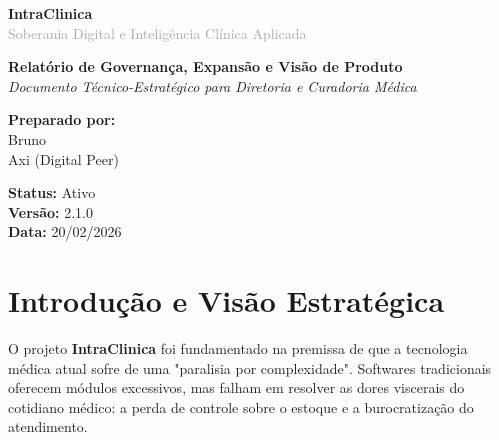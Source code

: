 \documentclass[11pt,a4paper,oneside]{article}
\begin{document}
\begin{titlepage}
    \centering
    \vspace*{2cm}
    {\Huge \bfseries \textcolor{MedBlue}{IntraClinica}} \\
    \vspace{0.5cm}
    {\Large \textcolor{DarkGrey}{Soberania Digital e Inteligência Clínica Aplicada}} \\
    \vspace{2cm}
    
    \begin{tcolorbox}[colback=SoftBlue, colframe=MedBlue, arc=5pt, width=0.9\textwidth, center]
        \centering
        \textbf{\large Relatório de Governança, Expansão e Visão de Produto} \\
        \vspace{0.2cm}
        \textit{Documento Técnico-Estratégico para Diretoria e Curadoria Médica}
    \end{tcolorbox}
    
    \vfill
    
    \begin{minipage}{0.4\textwidth}
        \begin{flushleft} \large
            \textbf{Preparado por:} \\
            Bruno \\
            Axi (Digital Peer)
        \end{flushleft}
    \end{minipage}
    \begin{minipage}{0.4\textwidth}
        \begin{flushright} \large
            \textbf{Status:} Ativo \\
            \textbf{Versão:} 2.1.0 \\
            \textbf{Data:} 20/02/2026
        \end{flushright}
    \end{minipage}
    
    \vspace{1cm}
\end{titlepage}

\newpage
\tableofcontents
\newpage

\section{Introdução e Visão Estratégica}
O projeto \textbf{IntraClinica} foi fundamentado na premissa de que a tecnologia médica atual sofre de uma "paralisia por complexidade". Softwares tradicionais oferecem módulos excessivos, mas falham em resolver as dores viscerais do cotidiano médico: a perda de controle sobre o estoque e a burocratização do atendimento.
\end{document}
